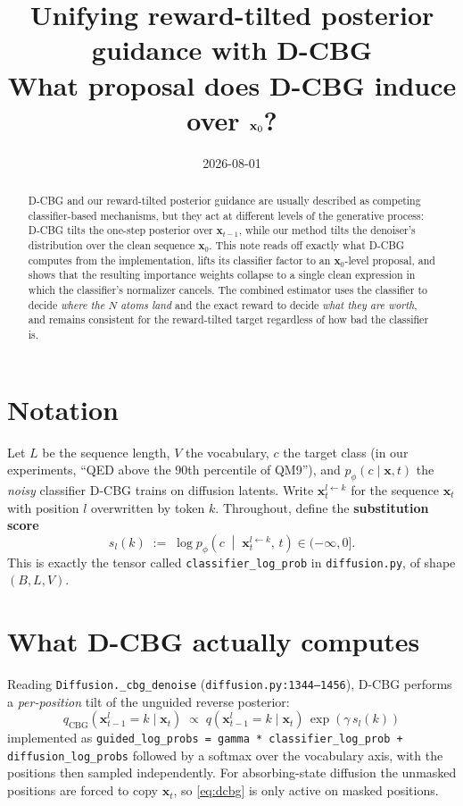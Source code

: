 \documentclass[11pt]{article}
\title{Unifying reward-tilted posterior guidance with D-CBG\\
\large What proposal does D-CBG induce over $\x_0$?}
\author{}
\date{2026-08-01}
\newcommand{\x}{\mathbf{x}}
\begin{document}
\maketitle

\begin{abstract}
D-CBG and our reward-tilted posterior guidance are usually described as
competing classifier-based mechanisms, but they act at different levels of the
generative process: D-CBG tilts the one-step posterior over $\x_{t-1}$, while
our method tilts the denoiser's distribution over the clean sequence $\x_0$.
This note reads off exactly what D-CBG computes from the implementation, lifts
its classifier factor to an $\x_0$-level proposal, and shows that the resulting
importance weights collapse to a single clean expression in which the
classifier's normalizer cancels. The combined estimator uses the classifier to
decide \emph{where the $N$ atoms land} and the exact reward to decide
\emph{what they are worth}, and remains consistent for the reward-tilted target
regardless of how bad the classifier is.
\end{abstract}

\section{Notation}

Let $L$ be the sequence length, $V$ the vocabulary, $c$ the target class (in
our experiments, ``QED above the 90th percentile of QM9''), and
$p_\phi(c \mid \x, t)$ the \emph{noisy} classifier D-CBG trains on diffusion
latents. Write $\x_t^{l \leftarrow k}$ for the sequence $\x_t$ with position $l$
overwritten by token $k$. Throughout, define the \textbf{substitution score}
\begin{equation}
s_l(k) \;:=\; \log p_\phi\!\left(c \;\middle|\; \x_t^{l \leftarrow k},\, t\right)
\in (-\infty, 0].
\label{eq:score}
\end{equation}
This is exactly the tensor called \texttt{classifier\_log\_prob} in
\texttt{diffusion.py}, of shape $(B, L, V)$.

\section{What D-CBG actually computes}

Reading \texttt{Diffusion.\_cbg\_denoise} (\texttt{diffusion.py:1344--1456}),
D-CBG performs a \emph{per-position} tilt of the unguided reverse posterior:
\begin{equation}
\boxed{\;
q_{\text{CBG}}\!\left(\x_{t-1}^l = k \mid \x_t\right)
  \;\propto\; q\!\left(\x_{t-1}^l = k \mid \x_t\right)\,
              \exp\!\left(\gamma\, s_l(k)\right)
\;}
\label{eq:dcbg}
\end{equation}
implemented as
\texttt{guided\_log\_probs = gamma * classifier\_log\_prob + diffusion\_log\_probs}
followed by a softmax over the vocabulary axis, with the positions then sampled
independently. For absorbing-state diffusion the unmasked positions are forced
to copy $\x_t$, so \eqref{eq:dcbg} is only active on masked positions.
\end{document}
